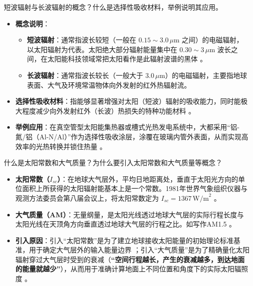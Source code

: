 \begin{problem}\label{exer:think_04_solar_02}
短波辐射与长波辐射的概念？什么是选择性吸收材料，举例说明其应用。
\end{problem}

\begin{solution}
\begin{itemize}
\item \textbf{概念说明}：
\begin{itemize}
\item \textbf{短波辐射}：通常指波长较短（一般在 \(0.15\sim3.0\,\mu\text{m}\) 之间）的电磁辐射，以太阳辐射为代表。太阳绝大部分辐射能量集中在 \(0.30\sim3\,\mu\text{m}\) 波长之间，在太阳能科技领域常把太阳看作是此辐射波谱的黑体 。
\item \textbf{长波辐射}：通常指波长较长（一般大于 \(3.0\,\mu\text{m}\)）的电磁辐射，主要指地球表面、大气及环境常温物体向外发射的红外热辐射流。
\end{itemize}
\item \textbf{选择性吸收材料}：指能够显著增强对太阳（短波）辐射的吸收能力，同时能极大程度减少向外发射红外（长波）热损失的特种功能材料 。
\item \textbf{举例应用}：在真空管型太阳能集热器或槽式光热发电系统中，大都采用“铝-氮/铝（Al-N/Al）”作为选择性吸收涂层，涂覆在玻璃内管外表面，从而实现高效率的光热转换并锁住热量 。
\end{itemize}
\end{solution}

\begin{problem}\label{exer:think_04_solar_03}
什么是太阳常数和大气质量？为什么要引入太阳常数和大气质量等概念？
\end{problem}

\begin{solution}
\begin{itemize}
\item \textbf{太阳常数（\(I_{sc}\)）}：在地球大气层外，平均日地距离处，垂直于太阳光方向的单位面积上所获得的太阳辐射能基本上是一个常数。1981年世界气象组织仪器与观测方法委员会第八届会议上，将太阳常数定为 \(I_{sc}=1367\,\text{W/m}^2\) 。
\item \textbf{大气质量（AM）}：无量纲量，是太阳光线透过地球大气层的实际行程长度与太阳光线在天顶角方向垂直透过地球大气层的行程之比。如写作AM1.5 。
\item \textbf{引入原因}：引入“太阳常数”是为了建立地球接收太阳能量的初始理论标准基准，用于确定大气层外的输入能量边界 ；引入“大气质量”是为了精确量化太阳辐射穿过大气层时受到的衰减（\textbf{“空间行程越长，产生的衰减越多，到达地面的能量就越少”}），从而用于准确计算地面上不同位置和角度下的实际太阳辐照度 。
\end{itemize}
\end{solution}

